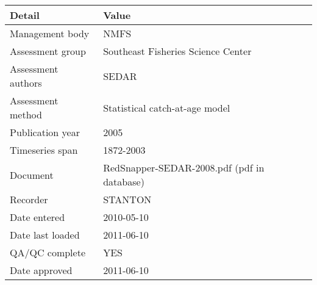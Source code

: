 \begin{table}[htb]
\centering
\begin{tabular}{lp{7cm}}
\toprule
Detail & Value \\
\midrule
Management body    & NMFS                                        \\
Assessment group   & Southeast Fisheries Science Center          \\
Assessment authors & SEDAR                                       \\
Assessment method  & Statistical catch-at-age model              \\
Publication year   & 2005                                        \\
Timeseries span    & 1872-2003                                   \\
Document           & RedSnapper-SEDAR-2008.pdf (pdf in database) \\
Recorder           & STANTON                                     \\
Date entered       & 2010-05-10                                  \\
Date last loaded   & 2011-06-10                                  \\
QA/QC complete     & YES                                         \\
Date approved      & 2011-06-10                                  \\
\bottomrule
\end{tabular}
\label{tab:assessdet}
\end{table}
